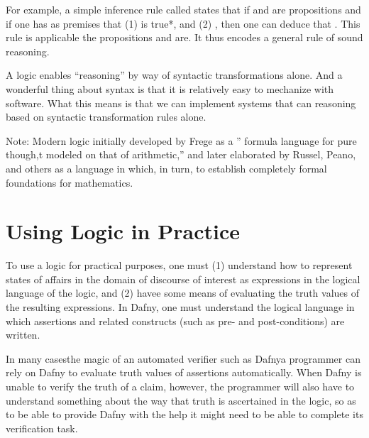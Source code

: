 \documentclass[letterpaper,10pt,english]{sphinxmanual}
\begin{document}
For example, a simple inference rule called  states that
if  and  are propositions and if one has as premises that (1)
 is true*, and (2) , then one can
deduce that . This rule is applicable  the
propositions  and  are. It thus encodes a general rule of sound
reasoning.

A logic enables  “reasoning” by way of syntactic
transformations alone. And a wonderful thing about syntax is that it
is relatively easy to mechanize with software. What this means is that
we can implement systems that can reasoning  based on
syntactic transformation rules alone.

Note: Modern logic initially developed by Frege as a ” formula
language for pure though,t modeled on that of arithmetic,” and later
elaborated by Russel, Peano, and others as a language in which, in
turn, to establish completely formal foundations for mathematics.


\section{Using Logic in Practice}
\label{\detokenize{09-propositional-logic:using-logic-in-practice}}
To use a logic for practical purposes, one must (1) understand how to
represent states of affairs in the domain of discourse of interest as
expressions in the logical language of the logic, and (2) havee some
means of evaluating the truth values of the resulting expressions. In
Dafny, one must understand the logical language in which assertions
and related constructs (such as pre- and post-conditions) are written.

In many cases\textendash{}the magic of an automated verifier such as Dafny\textendash{}a
programmer can rely on Dafny to evaluate truth values of assertions
automatically. When Dafny is unable to verify the truth of a claim,
however, the programmer will also have to understand something about
the way that truth is ascertained in the logic, so as to be able to
provide Dafny with the help it might need to be able to complete its
verification task.
\end{document}
